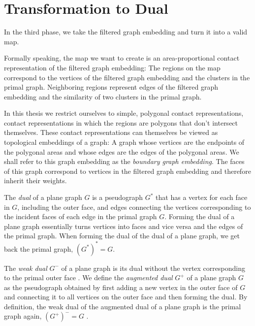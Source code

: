 \section{Transformation to Dual}
\label{sect:transformation-to-dual}

In the third phase, we take the filtered graph embedding and turn it into a valid map.

Formally speaking, the map we want to create is an area-proportional contact representation of the filtered graph embedding: The regions on the map correspond to the vertices of the filtered graph embedding and the clusters in the primal graph. Neighboring regions represent edges of the filtered graph embedding and the similarity of two clusters in the primal graph.

In this thesis we restrict ourselves to simple, polygonal contact representations, \ie{} contact representations in which the regions are polygons that don't intersect themselves. These contact representations can themselves be viewed as topological embeddings of a graph: A graph whose vertices are the endpoints of the polygonal areas and whose edges are the edges of the polygonal areas. We shall refer to this graph embedding as the \emph{boundary graph embedding}. The faces of this graph correspond to vertices in the filtered graph embedding and therefore inherit their weights.

The \emph{dual} of a plane graph $G$ is a pseudograph $G^*$ that has a vertex for each face in $G$, including the outer face, and edges connecting the vertices corresponding to the incident faces of each edge in the primal graph $G$. Forming the dual of a plane graph essentially turns vertices into faces and vice versa and  the edges of the primal graph. When forming the dual of the dual of a plane graph, we get back the primal graph, \ie{} $(G^*)^* = G$.

The \emph{weak dual} $G^-$ of a plane graph is its dual without the vertex corresponding to the primal outer face \cite{fleischner1974}. We define the \emph{augmented dual} $G^+$ of a plane graph $G$ as the pseudograph obtained by first adding a new vertex in the outer face of $G$ and connecting it to all vertices on the outer face and then forming the dual. By definition, the weak dual of the augmented dual of a plane graph is the primal graph again, \ie{} $(G^+)^- = G$ \cite{fleischner1974}.


